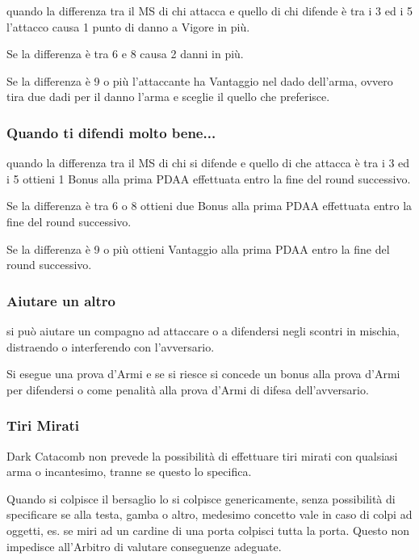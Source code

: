 \documentclass[12pt,a4paper,twoside,openany]{book}
\begin{document}
\begin{multicols}{2}
quando la differenza tra il MS di chi attacca e quello di chi difende è tra i 3 ed i 5 l'attacco causa 1 punto di danno a Vigore in più.

Se la differenza è tra 6 e 8 causa 2 danni in più.

Se la differenza è 9 o più l'attaccante ha Vantaggio nel dado dell'arma, ovvero tira due dadi per il danno l'arma e sceglie il quello che preferisce.

\subsubsection{Quando ti difendi molto bene...}

quando la differenza tra il MS di chi si difende e quello di che attacca è tra i 3 ed i 5 ottieni 1 Bonus alla prima PDAA effettuata entro la fine del round successivo.

Se la differenza è tra 6 o 8 ottieni due Bonus alla prima PDAA effettuata entro la fine del round successivo.

Se la differenza è 9 o più ottieni Vantaggio alla prima PDAA entro la fine del round successivo.

\subsubsection{Aiutare un altro}\label{aiutare}

si può aiutare un compagno ad attaccare o a difendersi negli scontri in mischia, distraendo o interferendo con l'avversario. 

Si esegue una prova d'Armi e se si riesce si concede un bonus alla prova d'Armi per difendersi o come penalità alla prova d'Armi di difesa dell'avversario.

\subsubsection{Tiri Mirati}\label{tirimirati}

Dark Catacomb non prevede la possibilità di effettuare tiri mirati con qualsiasi arma o incantesimo, tranne se questo lo specifica.

Quando si colpisce il bersaglio lo si colpisce genericamente, senza possibilità di specificare se alla testa, gamba o altro, medesimo concetto vale in caso di colpi ad oggetti, es. se miri ad un cardine di una porta colpisci tutta la porta. Questo non impedisce all'Arbitro di valutare conseguenze adeguate.


\end{multicols}
\end{document}
